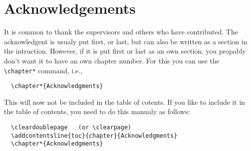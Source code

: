 \chapter*{Acknowledgements}

It is common to thank the supervisors and others who have contributed.
The acknowledgent is usualy put first, or last, but can also be
written as a section in the intruction. However, if it is put first
or last as an own section, you propably don't want it to have an own
chapter number. For this you can use the \verb+\chapter*+ command, i.e.,
\begin{verbatim}
  \chapter*{Acknowledgments}
\end{verbatim}
This will now not be included in the table of cotents. If you
like to include it in the table of contents, you need to do this
manualy as follows:
\begin{verbatim}
  \cleardoublepage   (or \clearpage)
  \addcontentsline{toc}{chapter}{Acknowledgments}
  \chapter*{Acknowledgments}
\end{verbatim}